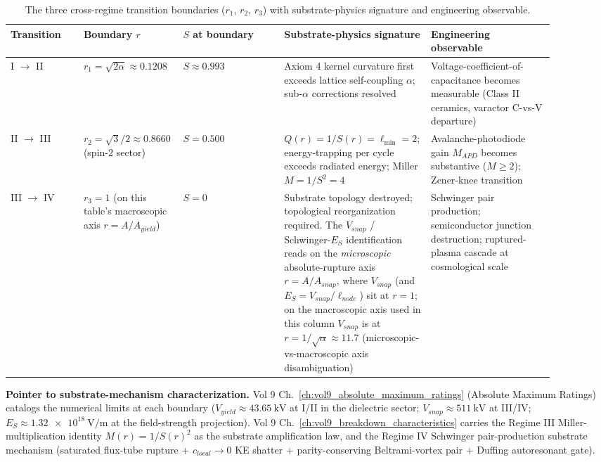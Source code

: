 \begin{table}[htbp]
\centering
\footnotesize
\setlength{\tabcolsep}{4pt}
\begin{tabular}{@{}p{0.13\linewidth} p{0.14\linewidth} p{0.18\linewidth} p{0.23\linewidth} p{0.22\linewidth}@{}}
\toprule
\textbf{Transition} & \textbf{Boundary $r$} & \textbf{$S$ at boundary} & \textbf{Substrate-physics signature} & \textbf{Engineering observable} \\
\midrule
I $\to$ II & $r_1 = \sqrt{2\alpha} \approx 0.1208$ & $S \approx 0.993$ & Axiom 4 kernel curvature first exceeds lattice self-coupling $\alpha$; sub-$\alpha$ corrections resolved & Voltage-coefficient-of-capacitance becomes measurable (Class II ceramics, varactor C-vs-V departure) \\
II $\to$ III & $r_2 = \sqrt{3}/2 \approx 0.8660$ (spin-2 sector) & $S = 0.500$ & $Q(r) = 1/S(r) = \ell_{\min} = 2$; energy-trapping per cycle exceeds radiated energy; Miller $M = 1/S^2 = 4$ & Avalanche-photodiode gain $M_{APD}$ becomes substantive ($M \ge 2$); Zener-knee transition \\
III $\to$ IV & $r_3 = 1$ (on this table's macroscopic axis $r = A/A_{yield}$) & $S = 0$ & Substrate topology destroyed; topological reorganization required. The $V_{snap}$ / Schwinger-$E_S$ identification reads on the \emph{microscopic} absolute-rupture axis $r = A/A_{snap}$, where $V_{snap}$ (and $E_S = V_{snap}/\ell_{node}$) sit at $r = 1$; on the macroscopic axis used in this column $V_{snap}$ is at $r = 1/\sqrt{\alpha} \approx 11.7$ (microscopic-vs-macroscopic axis disambiguation) & Schwinger pair production; semiconductor junction destruction; ruptured-plasma cascade at cosmological scale \\
\bottomrule
\end{tabular}
\caption{The three cross-regime transition boundaries ($r_1$, $r_2$, $r_3$) with substrate-physics signature and engineering observable.}
\label{tab:vol9_phase_transitions}
\end{table}

\noindent
\textbf{Pointer to substrate-mechanism characterization.} Vol 9 Ch.~\ref{ch:vol9_absolute_maximum_ratings} (Absolute Maximum Ratings) catalogs the numerical limits at each boundary ($V_{yield} \approx \qty{43.65}{\kilo\volt}$ at I/II in the dielectric sector; $V_{snap} \approx \qty{511}{\kilo\volt}$ at III/IV; $E_S \approx \qty{1.32e18}{\volt\per\metre}$ at the field-strength projection). Vol 9 Ch.~\ref{ch:vol9_breakdown_characteristics} carries the Regime III Miller-multiplication identity $M(r) = 1/S(r)^2$ as the substrate amplification law, and the Regime IV Schwinger pair-production substrate mechanism (saturated flux-tube rupture + $c_{local} \to 0$ KE shatter + parity-conserving Beltrami-vortex pair + Duffing autoresonant gate).

